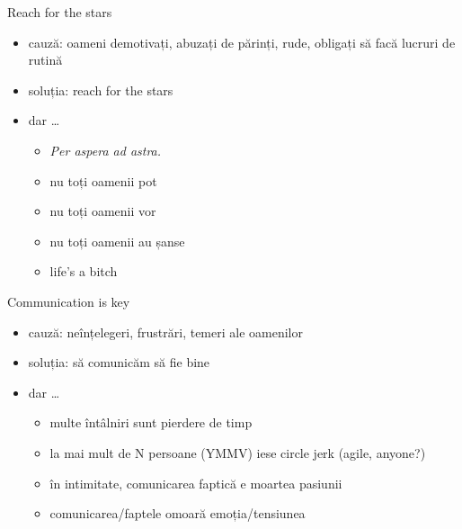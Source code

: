 \documentclass{simple}
\begin{document}
\begin{frame}{Reach for the stars}
  \begin{itemize}
    \pause \item cauză: oameni demotivați, abuzați de părinți, rude, obligați să facă lucruri de rutină
    \pause \item soluția: reach for the stars
    \pause \item dar \ldots
      \begin{itemize}
        \pause \item \textit{Per aspera ad astra.}
        \pause \item nu toți oamenii pot
        \pause \item nu toți oamenii vor
        \pause \item nu toți oamenii au șanse
        \pause \item life's a bitch
      \end{itemize}
  \end{itemize}
\end{frame}

\begin{frame}{Communication is key}
  \begin{itemize}
    \pause \item cauză: neînțelegeri, frustrări, temeri ale oamenilor
    \pause \item soluția: să comunicăm să fie bine
    \pause \item dar \ldots
      \begin{itemize}
        \pause \item multe întâlniri sunt pierdere de timp
        \pause \item la mai mult de N persoane (YMMV) iese circle jerk (agile, anyone?)
        \pause \item în intimitate, comunicarea faptică e moartea pasiunii
        \pause \item comunicarea/faptele omoară emoția/tensiunea
      \end{itemize}
  \end{itemize}
\end{frame}
\end{document}
